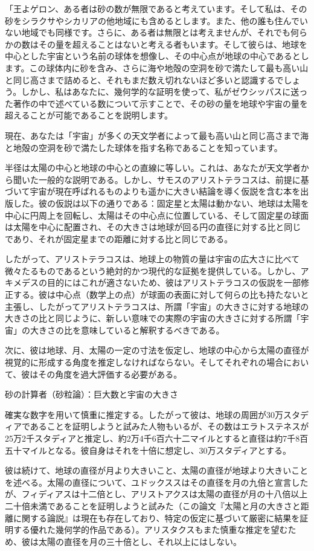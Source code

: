 \documentclass[a4paper,11pt,openany]{ltjsbook}
\begin{document}
「王よゲロン、ある者は砂の数が無限であると考えています。そして私は、その砂をシラクサやシカリアの他地域にも含めるとします。また、他の誰も住んでいない地域でも同様です。さらに、ある者は無限とは考えませんが、それでも何らかの数はその量を超えることはないと考える者もいます。そして彼らは、地球を中心とした宇宙という名前の球体を想像し、その中心点が地球の中心であるとします。この球体内に砂を含み、さらに海や地殻の空洞を砂で満たして最も高い山と同じ高さまで詰めると、それもまだ数え切れないほど多いと認識するでしょう。しかし、私はあなたに、幾何学的な証明を使って、私がゼウシッパスに送った著作の中で述べている数について示すことで、その砂の量を地球や宇宙の量を超えることが可能であることを説明します。

現在、あなたは「宇宙」が多くの天文学者によって最も高い山と同じ高さまで海と地殻の空洞を砂で満たした球体を指す名称であることを知っています。

半径は太陽の中心と地球の中心との直線に等しい。これは、あなたが天文学者から聞いた一般的な説明である。しかし、サモスのアリストテラコスは、前提に基づいて宇宙が現在呼ばれるものよりも遥かに大きい結論を導く仮説を含む本を出版した。彼の仮説は以下の通りである：固定星と太陽は動かない、地球は太陽を中心に円周上を回転し、太陽はその中心点に位置している、そして固定星の球面は太陽を中心に配置され、その大きさは地球が回る円の直径に対する比と同じであり、それが固定星までの距離に対する比と同じである。

したがって、アリストテラコスは、地球上の物質の量は宇宙の広大さに比べて微々たるものであるという絶対的かつ現代的な証拠を提供している。しかし、アキメデスの目的にはこれが適さないため、彼はアリストテラコスの仮説を一部修正する。彼は中心点（数学上の点）が球面の表面に対して何らの比も持たないと主張し、したがってアリストテラコスは、所謂「宇宙」の大きさに対する地球の大きさの比と同じように、新しい意味での実際の宇宙の大きさに対する所謂「宇宙」の大きさの比を意味していると解釈するべきである。

次に、彼は地球、月、太陽の一定の寸法を仮定し、地球の中心から太陽の直径が視覚的に形成する角度を推定しなければならない。そしてそれぞれの場合において、彼はその角度を過大評価する必要がある。

砂の計算者（砂粒論）：巨大数と宇宙の大きさ

確実な数字を用いて慎重に推定する。したがって彼は、地球の周囲が30万スタディアであることを証明しようと試みた人物もいるが、その数はエラトステネスが25万2千スタディアと推定し、約2万4千6百六十二マイルとすると直径は約7千8百五十マイルとなる。彼自身はそれを十倍に想定し、30万スタディアとする。

彼は続けて、地球の直径が月より大きいこと、太陽の直径が地球より大きいことを述べる。太陽の直径について、ユドックススはその直径を月の九倍と宣言したが、フィディアスは十二倍とし、アリストアクスは太陽の直径が月の十八倍以上二十倍未満であることを証明しようと試みた（この論文『太陽と月の大きさと距離に関する論説』は現在も存在しており、特定の仮定に基づいて厳密に結果を証明する優れた幾何学的作品である）。アリスタクスもまた慎重な推定を望むため、彼は太陽の直径を月の三十倍とし、それ以上にはしない。
\end{document}
